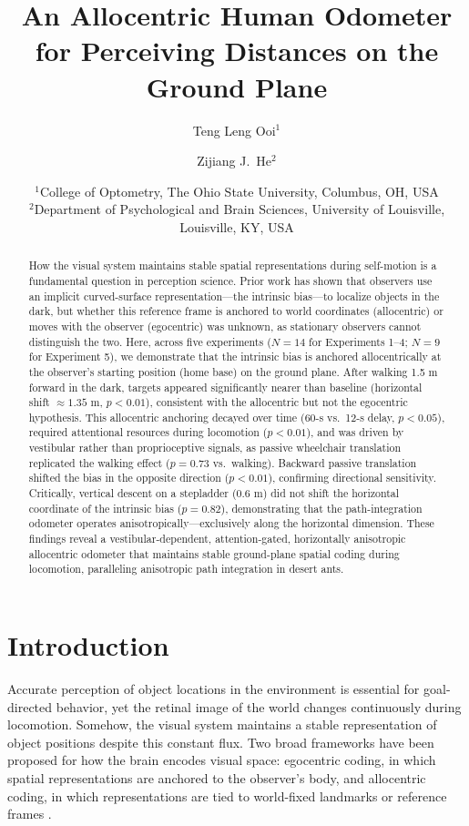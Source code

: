 \documentclass[11pt]{article}
\title{An Allocentric Human Odometer for Perceiving Distances on the Ground Plane}
\author{
  Teng Leng Ooi$^{1}$ \and
  Zijiang J.\ He$^{2}$
}
\date{
  $^{1}$College of Optometry, The Ohio State University, Columbus, OH, USA \\
  $^{2}$Department of Psychological and Brain Sciences, University of Louisville, Louisville, KY, USA
}
\begin{document}
\maketitle

\begin{abstract}
How the visual system maintains stable spatial representations during self-motion is a fundamental question in perception science. Prior work has shown that observers use an implicit curved-surface representation---the intrinsic bias---to localize objects in the dark, but whether this reference frame is anchored to world coordinates (allocentric) or moves with the observer (egocentric) was unknown, as stationary observers cannot distinguish the two. Here, across five experiments ($N = 14$ for Experiments 1--4; $N = 9$ for Experiment 5), we demonstrate that the intrinsic bias is anchored allocentrically at the observer's starting position (home base) on the ground plane. After walking 1.5 m forward in the dark, targets appeared significantly nearer than baseline (horizontal shift $\approx 1.35$ m, $p < 0.01$), consistent with the allocentric but not the egocentric hypothesis. This allocentric anchoring decayed over time (60-s vs.\ 12-s delay, $p < 0.05$), required attentional resources during locomotion ($p < 0.01$), and was driven by vestibular rather than proprioceptive signals, as passive wheelchair translation replicated the walking effect ($p = 0.73$ vs.\ walking). Backward passive translation shifted the bias in the opposite direction ($p < 0.01$), confirming directional sensitivity. Critically, vertical descent on a stepladder (0.6 m) did not shift the horizontal coordinate of the intrinsic bias ($p = 0.82$), demonstrating that the path-integration odometer operates anisotropically---exclusively along the horizontal dimension. These findings reveal a vestibular-dependent, attention-gated, horizontally anisotropic allocentric odometer that maintains stable ground-plane spatial coding during locomotion, paralleling anisotropic path integration in desert ants.
\end{abstract}

\section{Introduction}

Accurate perception of object locations in the environment is essential for goal-directed behavior, yet the retinal image of the world changes continuously during locomotion. Somehow, the visual system maintains a stable representation of object positions despite this constant flux. Two broad frameworks have been proposed for how the brain encodes visual space: egocentric coding, in which spatial representations are anchored to the observer's body, and allocentric coding, in which representations are tied to world-fixed landmarks or reference frames \citep{burgess2002, byrne2007}.
\end{document}
